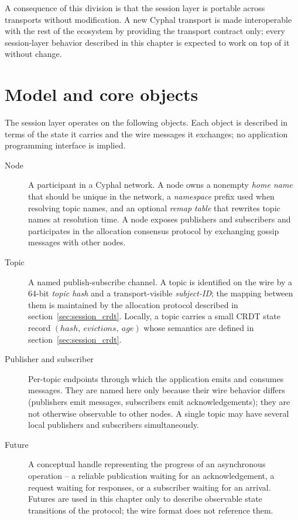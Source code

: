 \begin{remark}
    A consequence of this division is that the session layer is portable across
    transports without modification.
    A new Cyphal transport is made interoperable with the rest of the ecosystem by
    providing the transport contract only; every session-layer behavior described in
    this chapter is expected to work on top of it without change.
\end{remark}

\section{Model and core objects}\label{sec:session_model}

The session layer operates on the following objects.
Each object is described in terms of the state it carries and the wire messages it
exchanges; no application programming interface is implied.

\begin{description}
    \item[Node] A participant in a Cyphal network.
    A node owns a nonempty \emph{home name} that should be unique in the network,
    a \emph{namespace} prefix used when resolving topic names,
    and an optional \emph{remap table} that rewrites topic names at resolution time.
    A node exposes publishers and subscribers and participates in the allocation
    consensus protocol by exchanging gossip messages with other nodes.

    \item[Topic] A named publish-subscribe channel.
    A topic is identified on the wire by a 64-bit \emph{topic hash} and a
    transport-visible \emph{subject-ID}; the mapping between them is maintained by
    the allocation protocol described in section~\ref{sec:session_crdt}.
    Locally, a topic carries a small CRDT state record $(\mathit{hash},\
    \mathit{evictions},\ \mathit{age})$ whose semantics are defined in
    section~\ref{sec:session_crdt}.

    \item[Publisher and subscriber] Per-topic endpoints through which the application
    emits and consumes messages. They are named here only because their wire
    behavior differs (publishers emit messages, subscribers emit acknowledgements);
    they are not otherwise observable to other nodes.
    A single topic may have several local publishers and subscribers simultaneously.

    \item[Future] A conceptual handle representing the progress of an asynchronous
    operation -- a reliable publication waiting for an acknowledgement, a request
    waiting for responses, or a subscriber waiting for an arrival.
    Futures are used in this chapter only to describe observable state transitions
    of the protocol; the wire format does not reference them.
\end{description}

